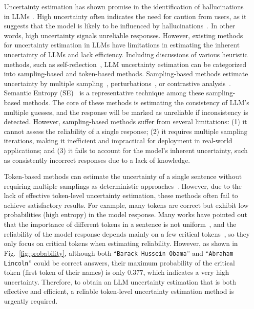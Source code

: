 Uncertainty estimation has shown promise in the identification of hallucinations in LLMs~\cite{xiao2021hallucination,huang2024survey}. High uncertainty often indicates the need for caution from users, as it suggests that the model is likely to be influenced by hallucinations~\cite{zhang2023enhancing,yoffe2024debunc}. In other words, high uncertainty signals unreliable responses. However, existing methods for uncertainty estimation in LLMs have limitations in estimating the inherent uncertainty of LLMs and lack efficiency. Including discussions of various heuristic methods, such as self-reflection~\cite{ji2023towards}, LLM uncertainty estimation can be categorized into sampling-based and token-based methods. Sampling-based methods estimate uncertainty by multiple sampling~\cite{liu2024exploring}, perturbations~\cite{zhang2024sac3reliable}, or contrastive analysis~\cite{huang2024uncttp}. Semantic Entropy (SE)~\cite{kuhn2023semantic} is a representative technique among these sampling-based methods. The core of these methods is estimating the consistency of LLM's multiple guesses, and the response will be marked as unreliable if inconsistency is detected. However, sampling-based methods suffer from several limitations: (1) it cannot assess the reliability of a single response; (2) it requires multiple sampling iterations, making it inefficient and impractical for deployment in real-world applications; and (3) it fails to account for the model's inherent uncertainty, such as consistently incorrect responses due to a lack of knowledge. 

Token-based methods can estimate the uncertainty of a single sentence without requiring multiple samplings as deterministic approaches~\cite{gupta2024language,fadeeva2024fact}. However, due to the lack of effective token-level uncertainty estimation, these methods often fail to achieve satisfactory results. For example, many tokens are correct but exhibit low probabilities (high entropy) in the model response.
Many works have pointed out that the importance of different tokens in a sentence is not uniform~\cite{lin2024critical,duan2024shifting}, and the reliability of the model response depends mainly on a few critical tokens~\cite{duan2024gtbench,bigelow2024forking}, so they only focus on critical tokens when estimating reliability. However, as shown in Fig.~\ref{fig:probability}, although both ``\texttt{Barack Hussein Obama}'' and ``\texttt{Abraham Lincoln}'' could be correct answers, their maximum probability of the critical token (first token of their names) is only $0.377$, which indicates a very high uncertainty. Therefore, to obtain an LLM uncertainty estimation that is both effective and efficient, a reliable token-level uncertainty estimation method is urgently required.


